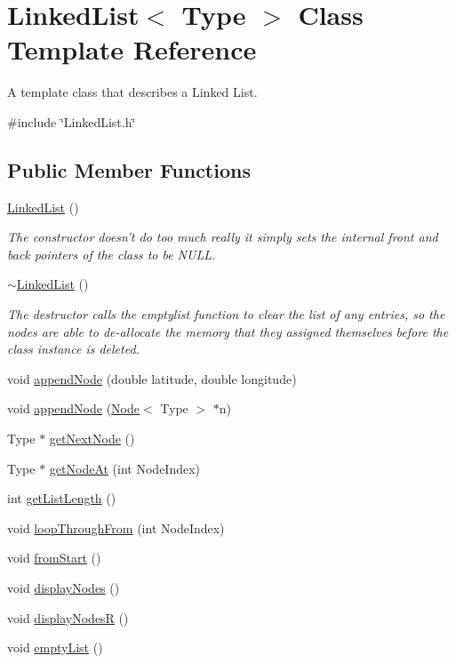 \hypertarget{classLinkedList}{\section{Linked\-List$<$ Type $>$ Class Template Reference}
\label{classLinkedList}
}


A template class that describes a Linked List.  




{\ttfamily \#include \char`\"{}Linked\-List.\-h\char`\"{}}

\subsection*{Public Member Functions}
\begin{DoxyCompactItemize}
\item 
\hyperlink{classLinkedList_ab071ad70f21bb30297b95ce8afecb95f}{Linked\-List} ()
\begin{DoxyCompactList}\small\item\em The constructor doesn't do too much really it simply sets the internal front and back pointers of the class to be N\-U\-L\-L. \end{DoxyCompactList}\item 
\hyperlink{classLinkedList_a06639bd2e85ed04bfcf004de12f19388}{$\sim$\-Linked\-List} ()
\begin{DoxyCompactList}\small\item\em The destructor calls the emptylist function to clear the list of any entries, so the nodes are able to de-\/allocate the memory that they assigned themselves before the class instance is deleted. \end{DoxyCompactList}\item 
void \hyperlink{classLinkedList_a9fca2f717c8b5f078ae6fc8ac0a95368}{append\-Node} (double latitude, double longitude)
\item 
void \hyperlink{classLinkedList_af8979406b4a82460fa34e14c445c5c7a}{append\-Node} (\hyperlink{classNode}{Node}$<$ Type $>$ $\ast$n)
\item 
Type $\ast$ \hyperlink{classLinkedList_ab8b608600fb42364988187b8e3eeab6f}{get\-Next\-Node} ()
\item 
Type $\ast$ \hyperlink{classLinkedList_a4148f0279418f828045787371f18ba0f}{get\-Node\-At} (int Node\-Index)
\item 
int \hyperlink{classLinkedList_a7b75ab339c58fc2c1a01bc3a64698c1c}{get\-List\-Length} ()
\item 
void \hyperlink{classLinkedList_ad7b0612f7f7a7a03d0283fdf42b49f39}{loop\-Through\-From} (int Node\-Index)
\item 
void \hyperlink{classLinkedList_a51f7c1e5fe8475c37ecd59b6f89d0b32}{from\-Start} ()
\item 
void \hyperlink{classLinkedList_ad837f86ed46df0d0b5a997b26b7ad7d2}{display\-Nodes} ()
\item 
void \hyperlink{classLinkedList_a56d026585684202f55c24d66400b586d}{display\-Nodes\-R} ()
\item 
void \hyperlink{classLinkedList_a731332e9de2b55ddbdd402bdc0e02930}{empty\-List} ()
\end{DoxyCompactItemize}
